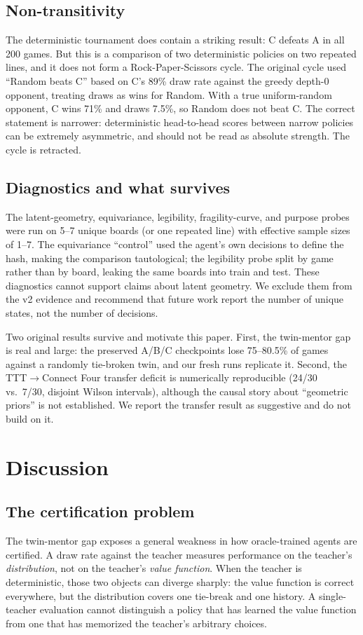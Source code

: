 \documentclass[conference]{IEEEtran}
\begin{document}
\subsection{Non-transitivity}
The deterministic tournament does contain a striking result: C defeats A in all 200 games. But this is a comparison of two deterministic policies on two repeated lines, and it does not form a Rock-Paper-Scissors cycle. The original cycle used ``Random beats C'' based on C's 89\% draw rate against the greedy depth-0 opponent, treating draws as wins for Random. With a true uniform-random opponent, C wins 71\% and draws 7.5\%, so Random does not beat C. The correct statement is narrower: deterministic head-to-head scores between narrow policies can be extremely asymmetric, and should not be read as absolute strength. The cycle is retracted.

\subsection{Diagnostics and what survives}
The latent-geometry, equivariance, legibility, fragility-curve, and purpose probes were run on 5--7 unique boards (or one repeated line) with effective sample sizes of 1--7. The equivariance ``control'' used the agent's own decisions to define the hash, making the comparison tautological; the legibility probe split by game rather than by board, leaking the same boards into train and test. These diagnostics cannot support claims about latent geometry. We exclude them from the v2 evidence and recommend that future work report the number of unique states, not the number of decisions.

Two original results survive and motivate this paper. First, the twin-mentor gap is real and large: the preserved A/B/C checkpoints lose 75--80.5\% of games against a randomly tie-broken twin, and our fresh runs replicate it. Second, the TTT$\to$Connect Four transfer deficit is numerically reproducible (24/30 vs.\ 7/30, disjoint Wilson intervals), although the causal story about ``geometric priors'' is not established. We report the transfer result as suggestive and do not build on it.

\section{Discussion}
\label{sec:discussion}

\subsection{The certification problem}
The twin-mentor gap exposes a general weakness in how oracle-trained agents are certified. A draw rate against the teacher measures performance on the teacher's \emph{distribution}, not on the teacher's \emph{value function}. When the teacher is deterministic, those two objects can diverge sharply: the value function is correct everywhere, but the distribution covers one tie-break and one history. A single-teacher evaluation cannot distinguish a policy that has learned the value function from one that has memorized the teacher's arbitrary choices.
\end{document}

